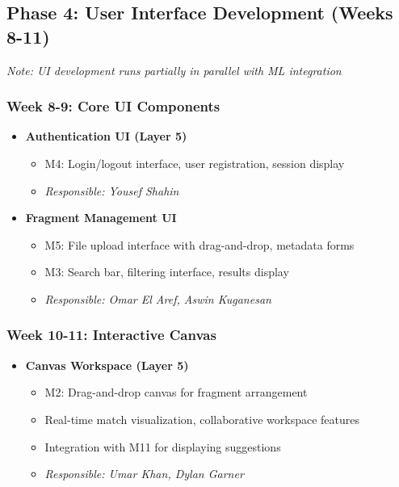 \documentclass[12pt, titlepage]{article}
\begin{document}
\subsection{Phase 4: User Interface Development (Weeks 8-11)}

\textit{Note: UI development runs partially in parallel with ML integration}

\subsubsection{Week 8-9: Core UI Components}
\begin{itemize}
    \item \textbf{Authentication UI (Layer 5)}
    \begin{itemize}
        \item M4: Login/logout interface, user registration, session display
        \item \textit{Responsible: Yousef Shahin}
    \end{itemize}
    \item \textbf{Fragment Management UI}
    \begin{itemize}
        \item M5: File upload interface with drag-and-drop, metadata forms
        \item M3: Search bar, filtering interface, results display
        \item \textit{Responsible: Omar El Aref, Aswin Kuganesan}
    \end{itemize}
\end{itemize}

\subsubsection{Week 10-11: Interactive Canvas}
\begin{itemize}
    \item \textbf{Canvas Workspace (Layer 5)}
    \begin{itemize}
        \item M2: Drag-and-drop canvas for fragment arrangement
        \item Real-time match visualization, collaborative workspace features
        \item Integration with M11 for displaying suggestions
        \item \textit{Responsible: Umar Khan, Dylan Garner}
    \end{itemize}
\end{itemize}
\end{document}
